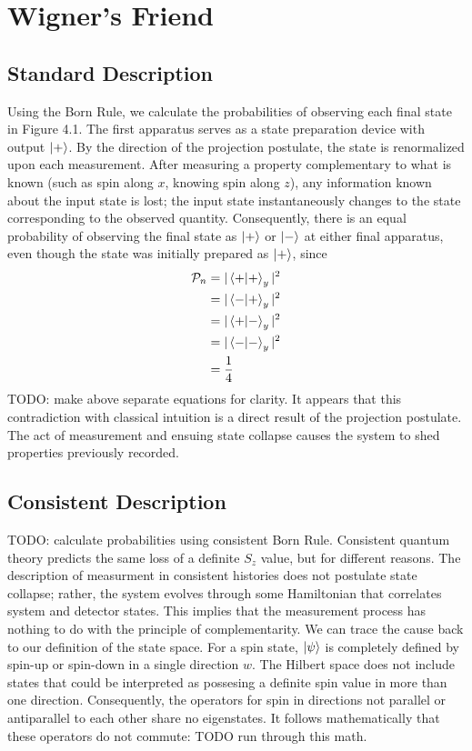 \chapter{Wigner's Friend}

\section{Standard Description}
Using the Born Rule, we calculate the probabilities of observing each final state in Figure 4.1. The first apparatus serves as a state preparation device with output $\ket{+}$. By the direction of the projection postulate, the state is renormalized upon each measurement. After measuring a property complementary to what is known (such as spin along $x$, knowing spin along $z$), any information known about the input state is lost; the input state instantaneously changes to the state corresponding to the observed quantity. Consequently, there is an equal probability of observing the final state as $\ket{+}$ or $\ket{-}$ at either final apparatus, even though the state was initially prepared as $\ket{+}$, since
\begin{align}
    \mathcal{P}_n &= |\braket{+|+}_y|^2 \\
                  &= |\braket{-|+}_y|^2 \\
                  &= |\braket{+|-}_y|^2 \\
                  &= |\braket{-|-}_y|^2 \\
                  &= \frac{1}{4}
\end{align}
TODO: make above separate equations for clarity.
It appears that this contradiction with classical intuition is a direct result of the projection postulate. The act of measurement and ensuing state collapse causes the system to shed properties previously recorded.

\section{Consistent Description}
TODO: calculate probabilities using consistent Born Rule.
Consistent quantum theory predicts the same loss of a definite $S_z$ value, but for different reasons.
The description of measurment in consistent histories does not postulate state collapse; rather, the system evolves through some Hamiltonian that correlates system and detector states. This implies that the measurement process has nothing to do with the principle of complementarity. We can trace the cause back to our definition of the state space. For a spin state, $\ket{\psi}$ is completely defined by spin-up or spin-down in a single direction $w$. The Hilbert space does not include states that could be interpreted as possesing a definite spin value in more than one direction. Consequently, the operators for spin in directions not parallel or antiparallel to each other share no eigenstates. It follows mathematically that these operators do not commute: TODO run through this math.


